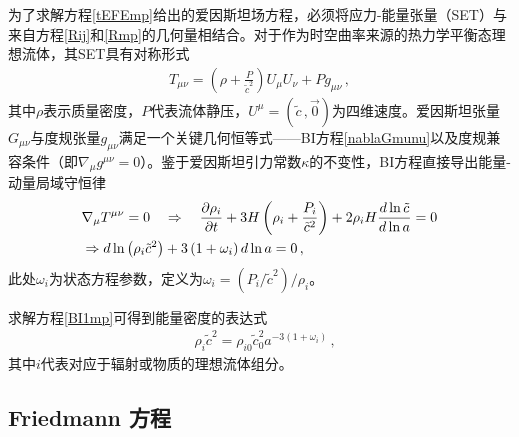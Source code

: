 \documentclass[jkps,preprint,fleqn]{revtex4}
\newcommand{\tc}{\tilde{c}}
\begin{document}
\begin{CJK*}{UTF8}{gbsn}
为了求解方程\eqref{tEFEmp}给出的爱因斯坦场方程，必须将应力-能量张量（SET）与来自方程\eqref{Rij}和\eqref{Rmp}的几何量相结合。对于作为时空曲率来源的热力学平衡态理想流体，其SET具有对称形式
\begin{align} T_{\mu\nu} = \left( \rho + \frac{P}{\tc^2} \right) U_{\mu} U_{\nu} + P g_{\mu\nu} \label{Tmunump} \,, \end{align}
其中$\rho$表示质量密度，$P$代表流体静压，$U^{\mu} = (\tc\,,\vec{0})$为四维速度。爱因斯坦张量$G_{\mu\nu}$与度规张量$g_{\mu\nu}$满足一个关键几何恒等式——BI方程\eqref{nablaGmunu}以及度规兼容条件（即$\nabla_{\mu} g^{\mu\nu} = 0$）。鉴于爱因斯坦引力常数$\kappa$的不变性，BI方程直接导出能量-动量局域守恒律
\begin{align} &\nabla_{\mu} \tensor{T}{^\mu^\nu} = 0 \quad \Rightarrow \quad \frac{\partial \rho_i}{\partial t} + 3 H \left( \rho_i + \frac{P_i}{\tc^2} \right) + 2 \rho_i H \frac{d \ln \tc}{d \ln a} = 0 \nonumber \\ &\Rightarrow d \ln \left( \rho_i \tc^2 \right) + 3 \left( 1 + \omega_i \right) d \ln a = 0 \label{BI1mp} \,, \end{align}
此处$\omega_i$为状态方程参数，定义为$\omega_i = (P_i/\tc^2)/\rho_i$。

求解方程\eqref{BI1mp}可得到能量密度的表达式
\begin{align} &\rho_i \tc^{2} = \rho_{i0} \tc_0^2 a^{-3 (1 + \omega_i)} \label{rhomp} \,,\end{align}
其中$i$代表对应于辐射或物质的理想流体组分。
\subsection{Friedmann 方程}\label{subsec:FE}


\end{CJK*}
\end{document}
